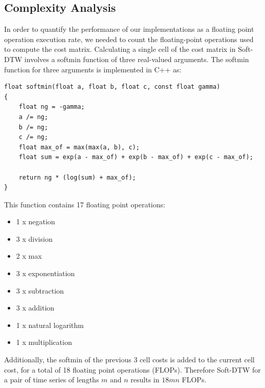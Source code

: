 \documentclass[12pt, letterpaper]{article}
\begin{document}
\subsection{Complexity Analysis}

In order to quantify the performance of our implementations as a floating point
operation execution rate, we needed to count the floating-point operations used
to compute the cost matrix. Calculating a single cell of the cost matrix in
Soft-DTW involves a softmin function of three real-valued arguments. The softmin
function for three arguments is implemented in C++ as:

\begin{verbatim}
float softmin(float a, float b, float c, const float gamma)
{
    float ng = -gamma;
    a /= ng;
    b /= ng;
    c /= ng;
    float max_of = max(max(a, b), c);
    float sum = exp(a - max_of) + exp(b - max_of) + exp(c - max_of);

    return ng * (log(sum) + max_of);
}
\end{verbatim}

This function contains 17 floating point operations:

\begin{itemize}
  \item 1 x negation
  \item 3 x division
  \item 2 x max
  \item 3 x exponentiation
  \item 3 x subtraction
  \item 3 x addition
  \item 1 x natural logarithm
  \item 1 x multiplication
\end{itemize}

Additionally, the softmin of the previous 3 cell costs is added to the current
cell cost, for a total of 18 floating point operations (FLOPs). Therefore
Soft-DTW for a pair of time series of lengths $m$ and $n$ results in $18mn$
FLOPs.
\end{document}
